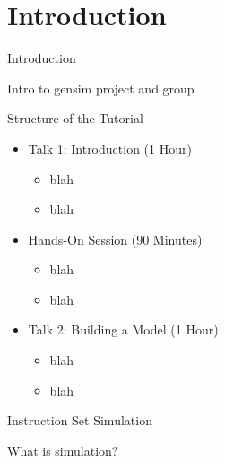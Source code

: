 
\section{Introduction}

\begin{frame}[t]{Introduction}

Intro to gensim project and group

\end{frame}

\begin{frame}{Structure of the Tutorial}

\begin{itemize}
\item Talk 1: Introduction (1 Hour)
\begin{itemize}
	\item blah
	\item blah
\end{itemize}

\item Hands-On Session (90 Minutes)
\begin{itemize}
	\item blah
	\item blah
\end{itemize}

\item Talk 2: Building a Model (1 Hour)
\begin{itemize}
	\item blah
	\item blah
\end{itemize}

\end{itemize}

\end{frame}

\begin{frame}[t]{Instruction Set Simulation}

What is simulation? 

\end{frame}


